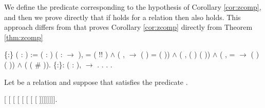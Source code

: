     We define the predicate  corresponding to the
    hypothesis of Corollary \ref{cor:zcomp}, and then we prove
    directly that if  holds for a relation  then 
     also holds. This approach differs from
    \cite{Nakazawa-Fujita2016} that proves Corollary
    \ref{cor:zcomp} directly from Theorem \ref{thm:zcomp} \begin{coqdoccode}
\coqdocemptyline
\coqdocnoindent
{}  \{:\} ( : ) := \coqdoctac{\ensuremath{\exists}} ( :  ) ( :  \ensuremath{\rightarrow} ),  = ( !\coqdocvar{\_}! ) \ensuremath{\land} (\coqdockw{\ensuremath{\forall}}  ,    \ensuremath{\rightarrow} ( ) = ( )) \ensuremath{\land} (\coqdockw{\ensuremath{\forall}} , ( )  ( )) \ensuremath{\land} (\coqdockw{\ensuremath{\forall}}  ,  =   \ensuremath{\rightarrow} ( )  ( )) \ensuremath{\land} (   ( \# )).\coqdoceol
\coqdocemptyline
\coqdocnoindent
{}  \{:\}: \coqdockw{\ensuremath{\forall}} ( :  ),   \ensuremath{\rightarrow}  .\coqdoceol
\coqdocnoindent
{}.\coqdoceol
\coqdocindent{1.00em}
  .    . \end{coqdoccode}
Let  be a relation
  and suppose that  satisfies the predicate . \begin{coqdoccode}
\coqdocemptyline
\coqdocindent{1.00em}
   [ [ [ [ [ [ [ [ ]]]]]]]]. \end{coqdoccode}
